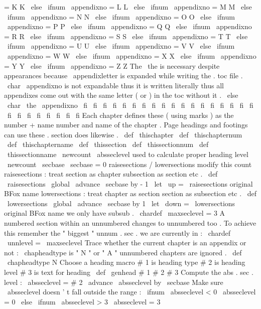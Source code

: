 {{{{{=
K
K
%
\
else
\
ifnum
\
appendixno
=
L
L
%
\
else
\
ifnum
\
appendixno
=
M
M
%
\
else
\
ifnum
\
appendixno
=
N
N
%
\
else
\
ifnum
\
appendixno
=
O
O
%
\
else
\
ifnum
\
appendixno
=
P
P
%
\
else
\
ifnum
\
appendixno
=
Q
Q
%
\
else
\
ifnum
\
appendixno
=
R
R
%
\
else
\
ifnum
\
appendixno
=
S
S
%
\
else
\
ifnum
\
appendixno
=
T
T
%
\
else
\
ifnum
\
appendixno
=
U
U
%
\
else
\
ifnum
\
appendixno
=
V
V
%
\
else
\
ifnum
\
appendixno
=
W
W
%
\
else
\
ifnum
\
appendixno
=
X
X
%
\
else
\
ifnum
\
appendixno
=
Y
Y
%
\
else
\
ifnum
\
appendixno
=
Z
Z
%
%
The
\
the
is
necessary
despite
appearances
because
\
appendixletter
is
%
expanded
while
writing
the
.
toc
file
.
\
char
\
appendixno
is
not
%
expandable
thus
it
is
written
literally
thus
all
appendixes
come
out
%
with
the
same
letter
(
or
)
in
the
toc
without
it
.
\
else
\
char
\
the
\
appendixno
\
fi
\
fi
\
fi
\
fi
\
fi
\
fi
\
fi
\
fi
\
fi
\
fi
\
fi
\
fi
\
fi
\
fi
\
fi
\
fi
\
fi
\
fi
\
fi
\
fi
\
fi
\
fi
\
fi
\
fi
\
fi
\
fi
}
%
Each
chapter
defines
these
(
using
marks
)
as
the
number
+
name
number
%
and
name
of
the
chapter
.
Page
headings
and
footings
can
use
%
these
.
section
does
likewise
.
\
def
\
thischapter
{
}
\
def
\
thischapternum
{
}
\
def
\
thischaptername
{
}
\
def
\
thissection
{
}
\
def
\
thissectionnum
{
}
\
def
\
thissectionname
{
}
\
newcount
\
absseclevel
%
used
to
calculate
proper
heading
level
\
newcount
\
secbase
\
secbase
=
0
%
raisesections
/
lowersections
modify
this
count
%
raisesections
:
treat
section
as
chapter
subsection
as
section
etc
.
\
def
\
raisesections
{
\
global
\
advance
\
secbase
by
-
1
}
\
let
\
up
=
\
raisesections
%
original
BFox
name
%
lowersections
:
treat
chapter
as
section
section
as
subsection
etc
.
\
def
\
lowersections
{
\
global
\
advance
\
secbase
by
1
}
\
let
\
down
=
\
lowersections
%
original
BFox
name
%
we
only
have
subsub
.
\
chardef
\
maxseclevel
=
3
%
%
A
numbered
section
within
an
unnumbered
changes
to
unnumbered
too
.
%
To
achieve
this
remember
the
"
biggest
"
unnum
.
sec
.
we
are
currently
in
:
\
chardef
\
unnlevel
=
\
maxseclevel
%
%
Trace
whether
the
current
chapter
is
an
appendix
or
not
:
%
\
chapheadtype
is
"
N
"
or
"
A
"
unnumbered
chapters
are
ignored
.
\
def
\
chapheadtype
{
N
}
%
Choose
a
heading
macro
%
#
1
is
heading
type
%
#
2
is
heading
level
%
#
3
is
text
for
heading
\
def
\
genhead
#
1
#
2
#
3
{
%
%
Compute
the
abs
.
sec
.
level
:
\
absseclevel
=
#
2
\
advance
\
absseclevel
by
\
secbase
%
Make
sure
\
absseclevel
doesn
'
t
fall
outside
the
range
:
\
ifnum
\
absseclevel
<
0
\
absseclevel
=
0
\
else
\
ifnum
\
absseclevel
>
3
\
absseclevel
=
3
\
}}}}}
